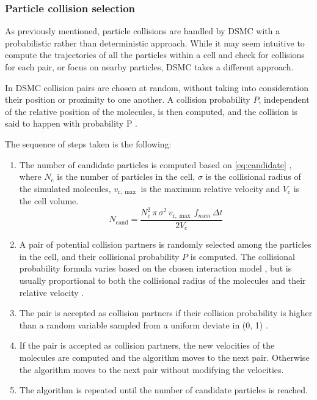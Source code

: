 \subsubsection{Particle collision selection}
\label{subsection:collision}
As previously mentioned, particle collisions are handled by DSMC with a probabilistic rather than deterministic approach. While it may seem intuitive to compute the trajectories of all the particles within a cell and check for collisions for each pair, or focus on nearby particles, DSMC takes a different approach.

In DSMC collision pairs are chosen at random, without taking into consideration their position or proximity to one another. A collision probability $P$, independent of the relative position of the molecules, is then computed, and the collision is said to happen with probability P \cite{bird, themontecarlo, natodsmc}.

The sequence of steps taken is the following:
\begin{enumerate}
    \item The number of candidate particles is computed based on \autoref{eq:candidate} \cite{themontecarlo}, where $N_{\mathrm{c}}$ is the number of particles in the cell, $\sigma$ is the collisional radius of the simulated molecules, $v_{\mathrm{r}, \max }$ is the maximum relative velocity and $V_{\mathrm{c}}$ is the cell volume.
    \begin{equation}
        N_{\mathrm{cand}}=\frac{N_{\mathrm{c}}^2\, \pi\, \sigma^2\, v_{\mathrm{r}, \max }\, f_{num}\, \Delta t}{2 V_{\mathrm{c}}}
        \label{eq:candidate}
    \end{equation}
    \item A pair of potential collision partners is randomly selected among the particles in the cell, and their collisional probability $P$ is computed. The collisional probability formula varies based on the chosen interaction model \cite{natodsmc}, but is usually proportional to both the collisional radius of the molecules and their relative velocity \cite{bird}.
    \item The pair is accepted as collision partners if their collision probability is higher than a random variable sampled from a uniform deviate in (0, 1) \cite{themontecarlo}.
    \item If the pair is accepted as collision partners, the new velocities of the molecules are computed and the algorithm moves to the next pair. Otherwise the algorithm moves to the next pair without modifying the velocities.
    \item The algorithm is repeated until the number of candidate particles is reached.
\end{enumerate}

